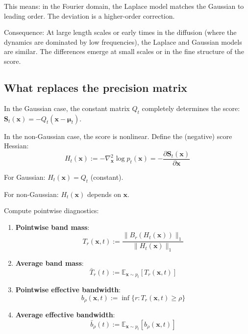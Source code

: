 \documentclass[11pt,a4paper]{article}
\theoremstyle{plain}
\theoremstyle{definition}
\newcommand{\Prec}{Q}
\newcommand{\vct}[1]{\mathbf{#1}}
\begin{document}
This means: in the Fourier domain, the Laplace model matches the Gaussian to leading order. The deviation is a higher-order correction.

Consequence: At large length scales or early times in the diffusion (where the dynamics are dominated by low frequencies), the Laplace and Gaussian models are similar. The differences emerge at small scales or in the fine structure of the score.

\subsection{What replaces the precision matrix}
\label{sec:replace-prec}

In the Gaussian case, the constant matrix $\Prec_t$ completely determines the score: $\vct{S}_t(\vct{x}) = -\Prec_t(\vct{x} - \boldsymbol{\mu}_t)$.

In the non-Gaussian case, the score is nonlinear. Define the (negative) score Hessian:
\begin{equation}
H_t(\vct{x}) := -\nabla^2_{\vct{x}}\log p_t(\vct{x}) = -\frac{\partial \vct{S}_t(\vct{x})}{\partial \vct{x}}
\end{equation}

For Gaussian: $H_t(\vct{x}) = \Prec_t$ (constant).

For non-Gaussian: $H_t(\vct{x})$ depends on $\vct{x}$.

Compute pointwise diagnostics:
\begin{enumerate}
\item \textbf{Pointwise band mass}:
\begin{equation}
T_r(\vct{x}, t) := \frac{\|B_r(H_t(\vct{x}))\|_1}{\|H_t(\vct{x})\|_1}
\end{equation}

\item \textbf{Average band mass}:
\begin{equation}
\bar{T}_r(t) := \mathbb{E}_{\vct{x} \sim p_t}[T_r(\vct{x}, t)]
\end{equation}

\item \textbf{Pointwise effective bandwidth}:
\begin{equation}
b_\rho(\vct{x}, t) := \inf\{r : T_r(\vct{x}, t) \ge \rho\}
\end{equation}

\item \textbf{Average effective bandwidth}:
\begin{equation}
\bar{b}_\rho(t) := \mathbb{E}_{\vct{x} \sim p_t}[b_\rho(\vct{x}, t)]
\end{equation}

\end{enumerate}
\end{document}
